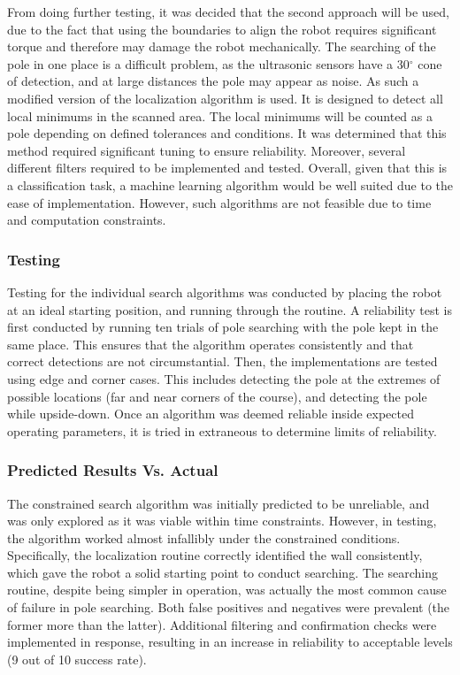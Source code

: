 \documentclass[ece]{uw-wkrpt}
\begin{document}
From doing further testing, it was decided that the second approach will be used, due to the fact that using the boundaries to align the robot requires significant torque and therefore may damage the robot mechanically. The searching of the pole in one place is a difficult problem, as the ultrasonic sensors have a 30$^{\circ}$ cone of detection, and at large distances the pole may appear as noise. As such a modified version of the localization algorithm is used. It is designed to detect all local minimums in the scanned area. The local minimums will be counted as a pole depending on defined tolerances and conditions. It was determined that this method required significant tuning to ensure reliability. Moreover, several different filters required to be implemented and tested. Overall, given that this is a classification task, a machine learning algorithm would be well suited due to the ease of implementation. However, such algorithms are not feasible due to time and computation constraints.

\subsubsection{Testing}

Testing for the individual search algorithms was conducted by placing the robot at an ideal starting position, and running through the routine. A reliability test is first conducted by running ten trials of pole searching with the pole kept in the same place. This ensures that the algorithm operates consistently and that correct detections are not circumstantial. Then, the implementations are tested using edge and corner cases. This includes detecting the pole at the extremes of possible locations (far and near corners of the course), and detecting the pole while upside-down. Once an algorithm was deemed reliable inside expected operating parameters, it is tried in extraneous to determine limits of reliability. 

\subsubsection{Predicted Results Vs. Actual}

The constrained search algorithm was initially predicted to be unreliable, and was only explored as it was viable within time constraints. However, in testing, the algorithm worked almost infallibly under the constrained conditions. Specifically, the localization routine correctly identified the wall consistently, which gave the robot a solid starting point to conduct searching. The searching routine, despite being simpler in operation, was actually the most common cause of failure in pole searching. Both false positives and negatives were prevalent (the former more than the latter). Additional filtering and confirmation checks were implemented in response, resulting in an increase in reliability to acceptable levels (9 out of 10 success rate). 
\end{document}

